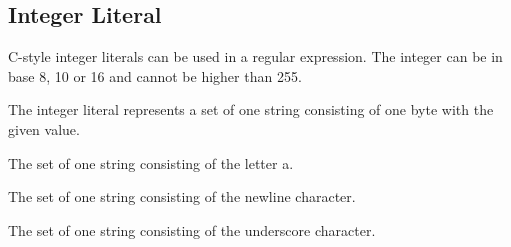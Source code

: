 
\subsection{Integer Literal}
{
	C-style integer literals can be used in a regular expression.
	The integer can be in base 8, 10 or 16 and cannot be higher than 255.
	
	The integer literal represents a set of one string consisting of one byte
	with the given value.
	
	\begin{itemize}
	{
		\item[\texttt{95}] The set of one string consisting of the letter a.
		
		\item[\texttt{012}] The set of one string consisting of the
			newline character.
		
		\item[\texttt{0x5F}] The set of one string consisting of the
			underscore character.
	}
	\end{itemize}
}
